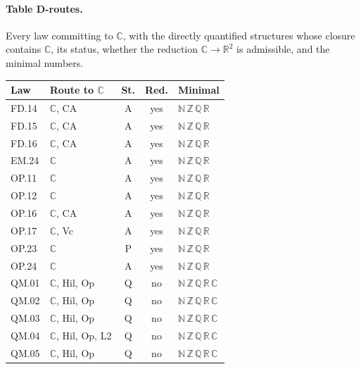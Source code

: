 \paragraph{Table D-routes.} Every law committing to $\mathbb C$, with the directly quantified structures whose closure contains $\mathbb C$, its status, whether the reduction $\mathbb C\to\mathbb R^2$ is admissible, and the minimal numbers.
{\scriptsize\setlength{\tabcolsep}{3pt}
\begin{longtable}{l p{6.8cm} c c l}
\toprule
Law & Route to $\mathbb C$ & St. & Red. & Minimal \\
\midrule
\endhead
\bottomrule\endfoot
FD.14 & $\mathbb C$, \textsf{CA} & A & yes & $\mathbb N\,\mathbb Z\,\mathbb Q\,\mathbb R$ \\
FD.15 & $\mathbb C$, \textsf{CA} & A & yes & $\mathbb N\,\mathbb Z\,\mathbb Q\,\mathbb R$ \\
FD.16 & $\mathbb C$, \textsf{CA} & A & yes & $\mathbb N\,\mathbb Z\,\mathbb Q\,\mathbb R$ \\
EM.24 & $\mathbb C$ & A & yes & $\mathbb N\,\mathbb Z\,\mathbb Q\,\mathbb R$ \\
OP.11 & $\mathbb C$ & A & yes & $\mathbb N\,\mathbb Z\,\mathbb Q\,\mathbb R$ \\
OP.12 & $\mathbb C$ & A & yes & $\mathbb N\,\mathbb Z\,\mathbb Q\,\mathbb R$ \\
OP.16 & $\mathbb C$, \textsf{CA} & A & yes & $\mathbb N\,\mathbb Z\,\mathbb Q\,\mathbb R$ \\
OP.17 & $\mathbb C$, \textsf{Vc} & A & yes & $\mathbb N\,\mathbb Z\,\mathbb Q\,\mathbb R$ \\
OP.23 & $\mathbb C$ & P & yes & $\mathbb N\,\mathbb Z\,\mathbb Q\,\mathbb R$ \\
OP.24 & $\mathbb C$ & A & yes & $\mathbb N\,\mathbb Z\,\mathbb Q\,\mathbb R$ \\
QM.01 & $\mathbb C$, \textsf{Hil}, \textsf{Op} & Q & no & $\mathbb N\,\mathbb Z\,\mathbb Q\,\mathbb R\,\mathbb C$ \\
QM.02 & $\mathbb C$, \textsf{Hil}, \textsf{Op} & Q & no & $\mathbb N\,\mathbb Z\,\mathbb Q\,\mathbb R\,\mathbb C$ \\
QM.03 & $\mathbb C$, \textsf{Hil}, \textsf{Op} & Q & no & $\mathbb N\,\mathbb Z\,\mathbb Q\,\mathbb R\,\mathbb C$ \\
QM.04 & $\mathbb C$, \textsf{Hil}, \textsf{Op}, \textsf{L2} & Q & no & $\mathbb N\,\mathbb Z\,\mathbb Q\,\mathbb R\,\mathbb C$ \\
QM.05 & $\mathbb C$, \textsf{Hil}, \textsf{Op} & Q & no & $\mathbb N\,\mathbb Z\,\mathbb Q\,\mathbb R\,\mathbb C$ \\

\end{longtable}}
